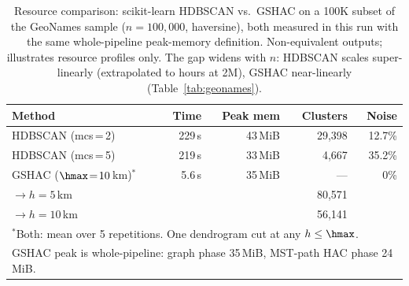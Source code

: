 \begin{table}[!ht]
\caption{Resource comparison: scikit-learn HDBSCAN vs.\ GSHAC on a 100K
  subset of the GeoNames sample (\(n = 100{,}000\), haversine), both measured
  in this run with the same whole-pipeline peak-memory definition.
  Non-equivalent outputs; illustrates resource profiles only. The gap widens with
  \(n\): HDBSCAN scales super-linearly (extrapolated to hours at 2M), GSHAC
  near-linearly (Table~\ref{tab:geonames}).}
\label{tab:hdbscan}
\small
\begin{tabular}{lrrrr}
\toprule
\textbf{Method} & \textbf{Time} & \textbf{Peak mem} & \textbf{Clusters} & \textbf{Noise} \\
\midrule
HDBSCAN (mcs\,=\,2) & 229\,s & 43\,MiB & 29{,}398 & 12.7\% \\
HDBSCAN (mcs\,=\,5) & 219\,s & 33\,MiB & 4{,}667 & 35.2\% \\
\addlinespace
GSHAC (\(\hmax\!=\!10\)\,km)\(^{*}\) & 5.6\,s & 35\,MiB & --- & 0\% \\
\quad\(\to h\!=\!5\)\,km  & & & 80{,}571 & \\
\quad\(\to h\!=\!10\)\,km & & & 56{,}141 & \\
\bottomrule
\multicolumn{5}{l}{\footnotesize \(^{*}\)Both: mean over 5 repetitions. One dendrogram cut at any \(h \leq \hmax\).} \\
\multicolumn{5}{l}{\footnotesize GSHAC peak is whole-pipeline: graph phase 35\,MiB, MST-path HAC phase 24\,MiB.}
\end{tabular}
\end{table}